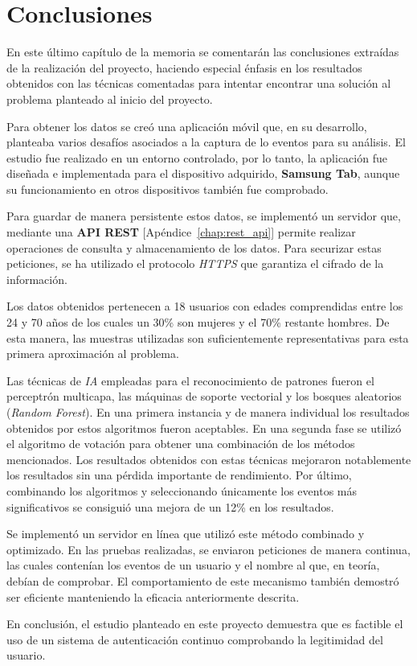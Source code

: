 \chapter{Conclusiones}
\label{chap:conclusions}


En este último capítulo de la memoria se comentarán las conclusiones extraídas de la realización del proyecto, haciendo especial énfasis en los resultados obtenidos con las técnicas comentadas para intentar encontrar una solución al problema planteado al inicio del proyecto.

Para obtener los datos se creó una aplicación móvil que, en su desarrollo, planteaba varios desafíos asociados a la captura de lo eventos para su análisis. El estudio fue realizado en un entorno controlado, por lo tanto, la aplicación fue diseñada e implementada para el dispositivo adquirido, \textbf{Samsung Tab}, aunque su funcionamiento en otros dispositivos también fue comprobado.

Para guardar de manera persistente estos datos, se implementó un servidor que, mediante una \textbf{API REST} [Apéndice~\ref{chap:rest_api}] permite realizar operaciones de consulta y almacenamiento de los datos. Para securizar estas peticiones, se ha utilizado el protocolo \textit{HTTPS} que garantiza el cifrado de la información.

Los datos obtenidos pertenecen a 18 usuarios con edades comprendidas entre los 24 y 70 años de los cuales un 30\% son mujeres y el 70\% restante hombres. De esta manera, las muestras utilizadas son suficientemente representativas para esta primera aproximación al problema.

Las técnicas de \textit{IA} empleadas para el reconocimiento de patrones fueron el perceptrón multicapa, las máquinas de soporte vectorial y los bosques aleatorios (\textit{Random Forest}). En una primera instancia y de manera individual los resultados obtenidos por estos algoritmos fueron aceptables. En una segunda fase se utilizó el algoritmo de votación para obtener una combinación de los métodos mencionados. Los resultados obtenidos con estas técnicas mejoraron notablemente los resultados sin una pérdida importante de rendimiento. Por último, combinando los algoritmos y  seleccionando únicamente los eventos más significativos se consiguió una mejora de un 12\% en los resultados.

Se implementó un servidor en línea que utilizó este método combinado y optimizado. En las pruebas realizadas, se enviaron peticiones de manera continua, las cuales contenían los eventos de un usuario y el nombre al que, en teoría, debían de comprobar. El comportamiento de este mecanismo también demostró ser eficiente manteniendo la eficacia anteriormente descrita.

En conclusión, el estudio planteado en este proyecto demuestra que es factible el uso de un sistema de autenticación continuo comprobando la legitimidad del usuario.
